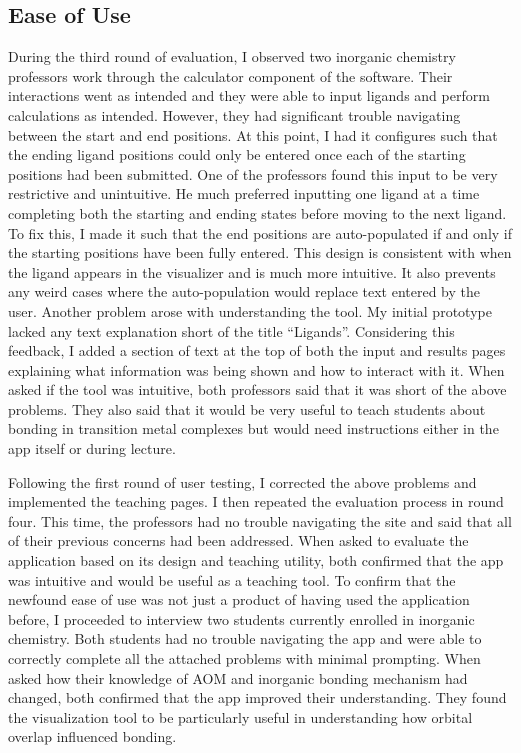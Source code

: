 \documentclass[10pt,twocolumn]{article}
\begin{document}
\subsection{Ease of Use}
During the third round of evaluation, I observed two inorganic chemistry professors work through the calculator component of the software. Their interactions went as intended and they were able to input ligands and perform calculations as intended. However, they had significant trouble navigating between the start and end positions. At this point, I had it configures such that the ending ligand positions could only be entered once each of the starting positions had been submitted. One of the professors found this input to be very restrictive and unintuitive. He much preferred inputting one ligand at a time completing both the starting and ending states before moving to the next ligand. To fix this, I made it such that the end positions are auto-populated if and only if the starting positions have been fully entered. This design is consistent with when the ligand appears in the visualizer and is much more intuitive. It also prevents any weird cases where the auto-population would replace text entered by the user. Another problem arose with understanding the tool. My initial prototype lacked any text explanation short of the title ``Ligands''. Considering this feedback, I added a section of text at the top of both the input and results pages explaining what information was being shown and how to interact with it. When asked if the tool was intuitive, both professors said that it was short of the above problems. They also said that it would be very useful to teach students about bonding in transition metal complexes but would need instructions either in the app itself or during lecture.

Following the first round of user testing, I corrected the above problems and implemented the teaching pages. I then repeated the evaluation process in round four. This time, the professors had no trouble navigating the site and said that all of their previous concerns had been addressed. When asked to evaluate the application based on its design and teaching utility, both confirmed that the app was intuitive and would be useful as a teaching tool. To confirm that the newfound ease of use was not just a product of having used the application before, I proceeded to interview two students currently enrolled in inorganic chemistry. Both students had no trouble navigating the app and were able to correctly complete all the attached problems with minimal prompting. When asked how their knowledge of AOM and inorganic bonding mechanism had changed, both confirmed that the app improved their understanding. They found the visualization tool to be particularly useful in understanding how orbital overlap influenced bonding. 
\end{document}
